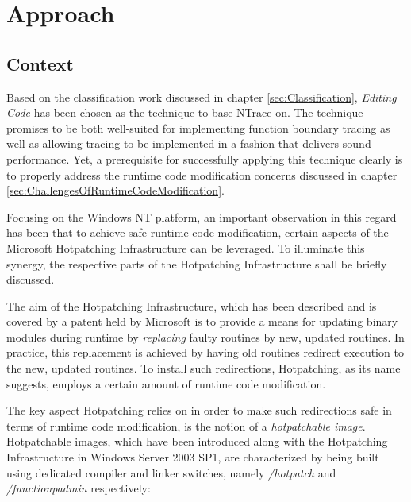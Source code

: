 \chapter{Approach}
\label{sec:Approach}

\section{Context}
Based on the classification work discussed in chapter \ref{sec:Classification}, 
\emph{Editing Code} has been chosen as the technique to base NTrace on. The technique
promises to be both well-suited for implementing function boundary tracing as well as allowing
tracing to be implemented in a fashion that delivers sound performance. Yet, a prerequisite 
for successfully applying this technique clearly is to properly address the runtime code 
modification concerns discussed in chapter \ref{sec:ChallengesOfRuntimeCodeModification}.

Focusing on the Windows NT platform, an important observation in this regard has been 
that to achieve safe runtime code modification, certain aspects of the Microsoft
Hotpatching Infrastructure can be leveraged. To illuminate this synergy, the respective
parts of the Hotpatching Infrastructure shall be briefly discussed.

The aim of the Hotpatching Infrastructure, which has been described and is covered by a 
patent held by Microsoft \cite{HotpPatent} is to provide a means for updating binary
modules during runtime by \emph{replacing} faulty routines by new, updated routines. 
In practice, this replacement is achieved by having old routines redirect execution to the new, 
updated routines. To install such redirections, Hotpatching, as its name suggests, employs a 
certain amount of runtime code modification.

The key aspect Hotpatching relies on in order to make such redirections safe in terms
of runtime code modification, is the notion of a \emph{hotpatchable image}. Hotpatchable
images, which have been introduced along with the Hotpatching Infrastructure in Windows
Server 2003 SP1, are characterized by being built using dedicated compiler and linker 
switches, namely \emph{/hotpatch} and \emph{/functionpadmin} respectively:

